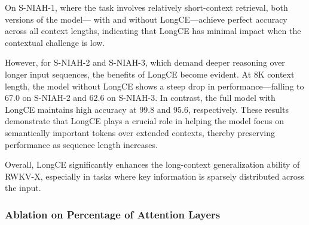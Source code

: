 On S-NIAH-1, where the task involves relatively short-context retrieval, both versions of the model— with and without LongCE—achieve perfect accuracy across all context lengths, indicating that LongCE has minimal impact when the contextual challenge is low.

However, for S-NIAH-2 and S-NIAH-3, which demand deeper reasoning over longer input sequences, the benefits of LongCE become evident. At 8K context length, the model without LongCE shows a steep drop in performance—falling to 67.0 on S-NIAH-2 and 62.6 on S-NIAH-3. In contrast, the full model with LongCE maintains high accuracy at 99.8 and 95.6, respectively. These results demonstrate that LongCE plays a crucial role in helping the model focus on semantically important tokens over extended contexts, thereby preserving performance as sequence length increases.

Overall, LongCE significantly enhances the long-context generalization ability of RWKV-X, especially in tasks where key information is sparsely distributed across the input.

\begin{table}[h]
\centering
\caption{Ablation Study on LongCE Loss using the S-NIAH Benchmark (Higher is Better).}
\label{tab:longce_ablation}
\end{table}

\subsubsection{Ablation on Percentage of Attention Layers}

